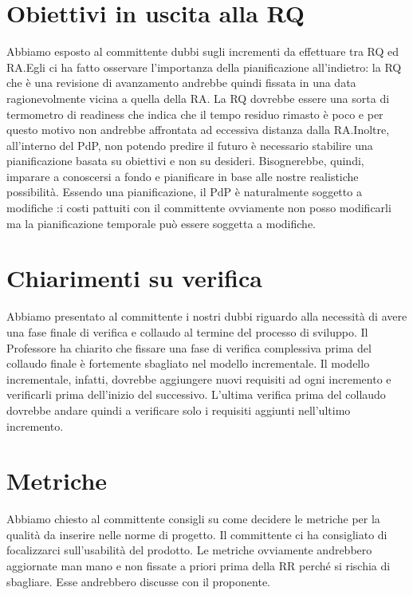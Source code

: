 \documentclass{article}
\begin{document}
\section{Obiettivi in uscita alla RQ}%
\label{sec:obiettivi_in_uscita_alla_RQ}
Abbiamo esposto al committente dubbi sugli incrementi da effettuare tra RQ ed RA.Egli ci ha fatto osservare l'importanza della pianificazione all'indietro: la RQ che è una revisione di avanzamento andrebbe quindi fissata in una data ragionevolmente vicina a quella della RA\@. La RQ dovrebbe essere una sorta di termometro di readiness che indica che il tempo residuo rimasto è poco e per questo motivo non andrebbe affrontata ad eccessiva distanza dalla RA.Inoltre, all'interno del PdP, non potendo predire il futuro è necessario stabilire una pianificazione basata su obiettivi e non su desideri. Bisognerebbe, quindi, imparare a conoscersi a fondo e pianificare in base alle nostre realistiche possibilità. Essendo una pianificazione, il PdP è naturalmente soggetto a modifiche :i costi pattuiti con il committente ovviamente non posso modificarli ma la pianificazione temporale può essere soggetta a modifiche. %

\section{Chiarimenti su verifica}%
\label{sec:chiarimenti_su_verifica}

Abbiamo presentato al committente i nostri dubbi riguardo alla necessità di avere una fase finale di verifica e collaudo al termine del processo di sviluppo. Il Professore ha chiarito che fissare una fase di verifica complessiva prima del collaudo finale è fortemente sbagliato nel modello incrementale. Il modello incrementale, infatti, dovrebbe aggiungere nuovi requisiti ad ogni incremento e verificarli prima dell'inizio del successivo. L'ultima verifica prima del collaudo dovrebbe andare quindi a verificare solo i requisiti aggiunti nell'ultimo incremento.

\section{Metriche}%
\label{sec:metriche}

Abbiamo chiesto al committente consigli su come decidere le metriche per la qualità da inserire nelle norme di progetto. Il committente ci ha consigliato di focalizzarci sull'usabilità del prodotto. Le metriche ovviamente andrebbero aggiornate man mano e non fissate a priori prima della RR perché si rischia di sbagliare. Esse andrebbero discusse con il proponente.
\end{document}
